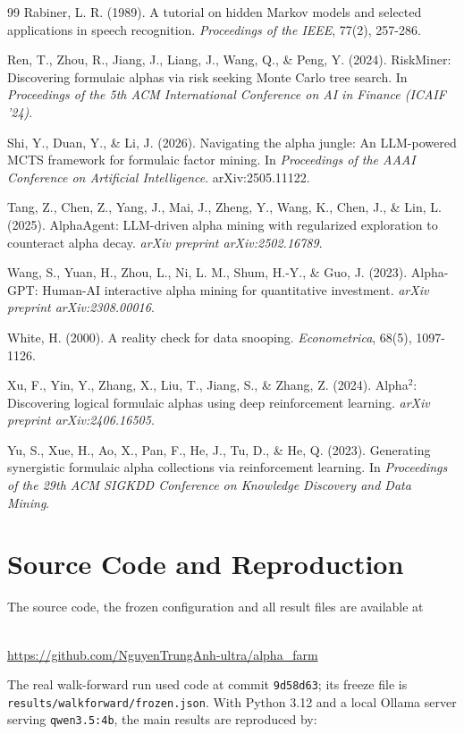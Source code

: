 \documentclass[12pt,a4paper,oneside]{book}
\theoremstyle{definition}
\newcommand{\code}[1]{\texttt{#1}}
\begin{document}
\begin{thebibliography}{99}
Rabiner, L. R. (1989). A tutorial on hidden Markov models and selected applications in speech recognition. \textit{Proceedings of the IEEE}, 77(2), 257-286.

Ren, T., Zhou, R., Jiang, J., Liang, J., Wang, Q., \& Peng, Y. (2024). RiskMiner: Discovering formulaic alphas via risk seeking Monte Carlo tree search. In \textit{Proceedings of the 5th ACM International Conference on AI in Finance (ICAIF '24)}.

Shi, Y., Duan, Y., \& Li, J. (2026). Navigating the alpha jungle: An LLM-powered MCTS framework for formulaic factor mining. In \textit{Proceedings of the AAAI Conference on Artificial Intelligence}. arXiv:2505.11122.

Tang, Z., Chen, Z., Yang, J., Mai, J., Zheng, Y., Wang, K., Chen, J., \& Lin, L. (2025). AlphaAgent: LLM-driven alpha mining with regularized exploration to counteract alpha decay. \textit{arXiv preprint arXiv:2502.16789}.

Wang, S., Yuan, H., Zhou, L., Ni, L. M., Shum, H.-Y., \& Guo, J. (2023). Alpha-GPT: Human-AI interactive alpha mining for quantitative investment. \textit{arXiv preprint arXiv:2308.00016}.

White, H. (2000). A reality check for data snooping. \textit{Econometrica}, 68(5), 1097-1126.

Xu, F., Yin, Y., Zhang, X., Liu, T., Jiang, S., \& Zhang, Z. (2024). Alpha$^2$: Discovering logical formulaic alphas using deep reinforcement learning. \textit{arXiv preprint arXiv:2406.16505}.

Yu, S., Xue, H., Ao, X., Pan, F., He, J., Tu, D., \& He, Q. (2023). Generating synergistic formulaic alpha collections via reinforcement learning. In \textit{Proceedings of the 29th ACM SIGKDD Conference on Knowledge Discovery and Data Mining}.

\end{thebibliography}

\newpage
\appendix

\chapter{Source Code and Reproduction}
\label{app:code}

The source code, the frozen configuration and all result files are available at
\begin{center}
\\[2mm]
\url{https://github.com/NguyenTrungAnh-ultra/alpha_farm}
\end{center}
The real walk-forward run used code at commit \code{9d58d63}; its freeze file is \code{results/walkforward/frozen.json}. With Python 3.12 and a local Ollama server serving \code{qwen3.5:4b}, the main results are reproduced by:
\end{document}
